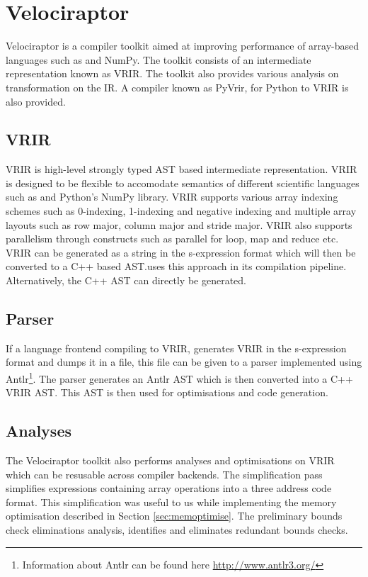 \section{Velociraptor}
Velociraptor is a compiler toolkit aimed at improving performance of array-based languages such as \matlab and NumPy. The toolkit consists of an intermediate representation known as VRIR. The toolkit also provides various analysis on transformation on the IR. A compiler known as PyVrir, for Python to VRIR is also provided. 
\subsection{VRIR}
VRIR is high-level strongly typed AST based intermediate representation. VRIR is designed to be flexible to accomodate semantics of different scientific languages such as \matlab and Python's NumPy library. VRIR supports various array indexing schemes such as 0-indexing, 1-indexing and negative indexing and multiple array layouts such as row major, column major and stride major. VRIR also supports parallelism through constructs such as parallel for loop, map and reduce etc. VRIR can be generated as a string in the s-expression format which will then be converted to a C++ based AST.\velocty uses this approach in its compilation pipeline. Alternatively, the C++ AST can directly be generated.

\subsection{Parser}
If a language frontend compiling to VRIR, generates VRIR in the s-expression format and dumps it in a file, this file can be given to a parser implemented using Antlr\footnote{Information about Antlr can be found here \url{http://www.antlr3.org/}}. The parser generates an Antlr AST which is then converted into a C++ VRIR AST. This AST is then used for optimisations and code generation.  
\subsection{Analyses}
The Velociraptor toolkit also performs analyses and optimisations on VRIR which  can be resusable across compiler backends. The simplification pass simplifies expressions containing array operations into a three address code format. This simplification was useful to us while implementing the memory optimisation described in Section \ref{sec:memoptimise}. The preliminary bounds check eliminations analysis, identifies and eliminates redundant bounds checks.
